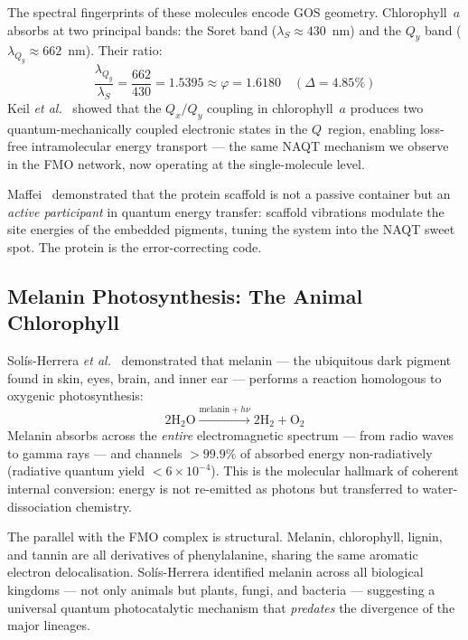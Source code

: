 \documentclass[11pt,twocolumn]{article}
\begin{document}
The spectral fingerprints of these molecules encode GOS geometry.
Chlorophyll~$a$ absorbs at two principal bands: the Soret band
($\lambda_S \approx 430$~nm) and the $Q_y$ band
($\lambda_{Q_y} \approx 662$~nm).  Their ratio:
\begin{equation}
  \frac{\lambda_{Q_y}}{\lambda_S}
  = \frac{662}{430} = 1.5395
  \approx \varphi = 1.6180 \quad (\Delta = 4.85\%)
  \label{eq:chlor_phi}
\end{equation}
Keil \textit{et al.}~\cite{Keil2024} showed that the $Q_x/Q_y$ coupling
in chlorophyll~$a$ produces two quantum-mechanically coupled electronic
states in the $Q$~region, enabling loss-free intramolecular energy
transport --- the same NAQT mechanism we observe in the FMO network, now
operating at the single-molecule level.

Maffei~\cite{Maffei2025} demonstrated that the protein scaffold is
not a passive container but an \emph{active participant} in quantum
energy transfer: scaffold vibrations modulate the site energies of the
embedded pigments, tuning the system into the NAQT sweet spot.  The
protein is the error-correcting code.

\subsection{Melanin Photosynthesis: The Animal Chlorophyll}

Sol\'is-Herrera \textit{et al.}~\cite{SolisHerrera2015} demonstrated that
melanin --- the ubiquitous dark pigment found in skin, eyes, brain, and
inner ear --- performs a reaction homologous to oxygenic photosynthesis:
\begin{equation}
  2\text{H}_2\text{O}
  \xrightarrow{\text{melanin} + h\nu}
  2\text{H}_2 + \text{O}_2
  \label{eq:melanin}
\end{equation}
Melanin absorbs across the \emph{entire} electromagnetic spectrum ---
from radio waves to gamma rays --- and channels $>99.9\%$ of absorbed
energy non-radiatively (radiative quantum yield $< 6 \times 10^{-4}$).
This is the molecular hallmark of coherent internal conversion:
energy is not re-emitted as photons but transferred to
water-dissociation chemistry.

The parallel with the FMO complex is structural.  Melanin,
chlorophyll, lignin, and tannin are all derivatives of phenylalanine,
sharing the same aromatic electron delocalisation.  Sol\'is-Herrera
identified melanin across all biological kingdoms --- not only animals
but plants, fungi, and bacteria --- suggesting a universal quantum
photocatalytic mechanism that \emph{predates} the divergence of the
major lineages.
\end{document}
